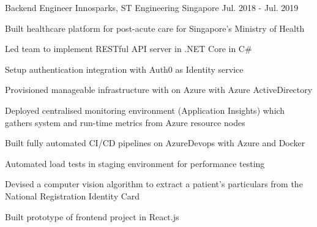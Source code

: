 \begin{cventries}
    \cventry
    {Backend Engineer} %
    {Innosparks, ST Engineering} %
    {Singapore} %
    {Jul. 2018 - Jul. 2019} %
    {
    \begin{cvitems} %
        \item {Built healthcare platform for post-acute care for Singapore's Ministry of Health }
        \item {Led team to implement RESTful API server in .NET Core in C\# }
        \item {Setup authentication integration with Auth0 as Identity service}
        \item {Provisioned manageable infrastructure with on Azure with Azure ActiveDirectory}
        \item {Deployed centralised monitoring environment (Application Insights) which gathers system and run-time metrics from Azure resource nodes}
        \item {Built fully automated CI/CD pipelines on AzureDevops with Azure and Docker}
        \item {Automated load tests in staging environment for performance testing}
        \item {Devised a computer vision algorithm to extract a patient's particulars from the National Registration Identity Card}
        \item {Built prototype of frontend project in React.js}
    \end{cvitems}
    }

   
\end{cventries}

